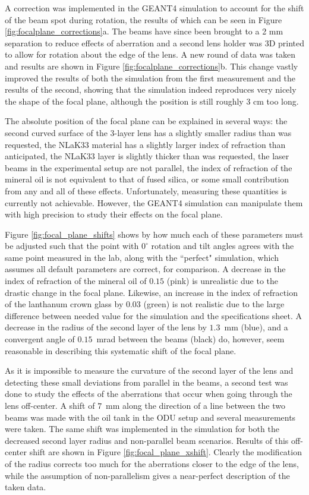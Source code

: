 A correction was implemented in the GEANT4 simulation to account for the shift of the beam spot during rotation, the results of which can be seen in Figure \ref{fig:focalplane_corrections}a. The beams have since been brought to a 2 mm separation to reduce effects of aberration and a second lens holder was 3D printed to allow for rotation about the edge of the lens. A new round of data was taken and results are shown in Figure \ref{fig:focalplane_corrections}b. This change vastly improved the results of both the simulation from the first measurement and the results of the second, showing that the simulation indeed reproduces very nicely the shape of the focal plane, although the position is still roughly 3 cm too long.

The absolute position of the focal plane can be explained in several ways: the second curved surface of the 3-layer lens has a slightly smaller radius than was requested, the NLaK33 material has a slightly larger index of refraction than anticipated, the NLaK33 layer is slightly thicker than was requested, the laser beams in the experimental setup are not parallel, the index of refraction of the mineral oil is not equivalent to that of fused silica, or some small contribution from any and all of these effects. Unfortunately, measuring these quantities is currently not achievable. However, the GEANT4 simulation can manipulate them with high precision to study their effects on the focal plane.

Figure \ref{fig:focal_plane_shifts} shows by how much each of these parameters must be adjusted such that the point with $0^\circ$ rotation and tilt angles agrees with the same point measured in the lab, along with the ``perfect" simulation, which assumes all default parameters are correct, for comparison. A decrease in the index of refraction of the mineral oil of $0.15$ (pink) is unrealistic due to the drastic change in the focal plane. Likewise, an increase in the index of refraction of the lanthanum crown glass by $0.03$ (green) is not realistic due to the large difference between needed value for the simulation and the specifications sheet. A decrease in the radius of the second layer of the lens by $1.3$~mm (blue), and a convergent angle of $0.15$~mrad between the beams (black) do, however, seem reasonable in describing this systematic shift of the focal plane. 

As it is impossible to measure the curvature of the second layer of the lens and detecting these small deviations from parallel in the beams, a second test was done to study the effects of the aberrations that occur when going through the lens off-center. A shift of $7$~mm along the direction of a line between the two beams was made with the oil tank in the ODU setup and several measurements were taken. The same shift was implemented in the simulation for both the decreased second layer radius and non-parallel beam scenarios. Results of this off-center shift are shown in Figure \ref{fig:focal_plane_xshift}. Clearly the modification of the radius corrects too much for the aberrations closer to the edge of the lens, while the assumption of non-parallelism gives a near-perfect description of the taken data.

